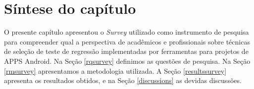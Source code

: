 \begin{comment}
\section{Ameaças à Validade}\label{threatstovalidity}


\textbf{Validade externa:} embora nosso estudo relate resultados com base em uma amostra que considerou pesquisadores e profissionais de teste de software, os resultados podem não ser generalizados para outros cenários. No entanto, este estudo pode ser considerado como um passo inicial para fornecer mais evidências sobre a conscientização e a percepção dos profissionais sobre o uso do teste de regressão na manutenção de aplicativos Android. Fornecemos os procedimentos e os dados de pesquisa para permitir mais replicações.

\textbf{Validade de construção:} no questionário, evitamos usar o termo testes de regressão. Em vez disso, usamos implicitamente a definição do teste de regressão, como uma estratégia para evitar vieses e impedir que os participantes pesquisem o conceito, antes de responder ao questionário. No entanto, alguns participantes podem não ter relacionado esse conceito aos testes de regressão.

\textbf{Validade de conclusão:} Neste estudo, não realizamos nenhuma análise quantitativa, pois a amostra não era grande o suficiente. Em vez disso, realizamos uma análise qualitativa, \textit{insights} sobre os pontos importantes a serem considerados, principalmente para futuras investigações.
\end{comment}



\section{Síntese do capítulo}

O presente capítulo apresentou o \textit{Survey} utilizado como instrumento de pesquisa para compreender qual a perspectiva de acadêmicos e profissionais sobre técnicas de seleção de teste de regressão implementadas por ferramentas para projetos de \ac{APPS} Android. Na Seção \ref{rqsurvey} definimos as questões de pesquisa. Na Seção \ref{rmsurvey} apresentamos a metodologia utilizada. A Seção \ref{resultssurvey} apresenta os resultados obtidos, e na Seção \ref{discussions} as devidas discussões.





























